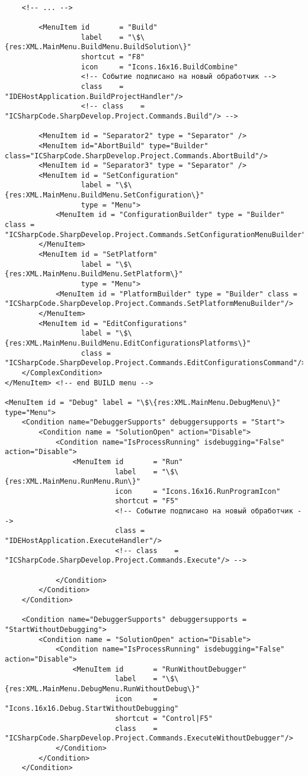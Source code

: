 \label{appendix:sd_config}

\begin{lstlisting}

	<!-- ... -->
	
		<MenuItem id       = "Build"
				  label    = "\$\{res:XML.MainMenu.BuildMenu.BuildSolution\}"
				  shortcut = "F8"
				  icon     = "Icons.16x16.BuildCombine"
				  <!-- Событие подписано на новый обработчик -->
				  class    = "IDEHostApplication.BuildProjectHandler"/>
				  <!-- class    = "ICSharpCode.SharpDevelop.Project.Commands.Build"/> -->

		<MenuItem id = "Separator2" type = "Separator" />
		<MenuItem id="AbortBuild" type="Builder" class="ICSharpCode.SharpDevelop.Project.Commands.AbortBuild"/>
		<MenuItem id = "Separator3" type = "Separator" />
		<MenuItem id = "SetConfiguration"
				  label = "\$\{res:XML.MainMenu.BuildMenu.SetConfiguration\}"
				  type = "Menu">
			<MenuItem id = "ConfigurationBuilder" type = "Builder" class = "ICSharpCode.SharpDevelop.Project.Commands.SetConfigurationMenuBuilder"/>
		</MenuItem>
		<MenuItem id = "SetPlatform"
				  label = "\$\{res:XML.MainMenu.BuildMenu.SetPlatform\}"
				  type = "Menu">
			<MenuItem id = "PlatformBuilder" type = "Builder" class = "ICSharpCode.SharpDevelop.Project.Commands.SetPlatformMenuBuilder"/>
		</MenuItem>
		<MenuItem id = "EditConfigurations"
				  label = "\$\{res:XML.MainMenu.BuildMenu.EditConfigurationsPlatforms\}"
				  class = "ICSharpCode.SharpDevelop.Project.Commands.EditConfigurationsCommand"/>
	</ComplexCondition>
</MenuItem> <!-- end BUILD menu -->

<MenuItem id = "Debug" label = "\$\{res:XML.MainMenu.DebugMenu\}" type="Menu">
	<Condition name="DebuggerSupports" debuggersupports = "Start">
		<Condition name = "SolutionOpen" action="Disable">
			<Condition name="IsProcessRunning" isdebugging="False" action="Disable">
				<MenuItem id       = "Run"
						  label    = "\$\{res:XML.MainMenu.RunMenu.Run\}"
						  icon     = "Icons.16x16.RunProgramIcon"
						  shortcut = "F5"
						  <!-- Событие подписано на новый обработчик -->
						  class = "IDEHostApplication.ExecuteHandler"/> 
						  <!-- class    = "ICSharpCode.SharpDevelop.Project.Commands.Execute"/> --> 
						  
			</Condition>
		</Condition>
	</Condition>
	
	<Condition name="DebuggerSupports" debuggersupports = "StartWithoutDebugging">
		<Condition name = "SolutionOpen" action="Disable">
			<Condition name="IsProcessRunning" isdebugging="False" action="Disable">
				<MenuItem id       = "RunWithoutDebugger"
						  label    = "\$\{res:XML.MainMenu.DebugMenu.RunWithoutDebug\}"
						  icon     = "Icons.16x16.Debug.StartWithoutDebugging"
						  shortcut = "Control|F5"
						  class    = "ICSharpCode.SharpDevelop.Project.Commands.ExecuteWithoutDebugger"/>
			</Condition>
		</Condition>
	</Condition>
	

\end{lstlisting}
